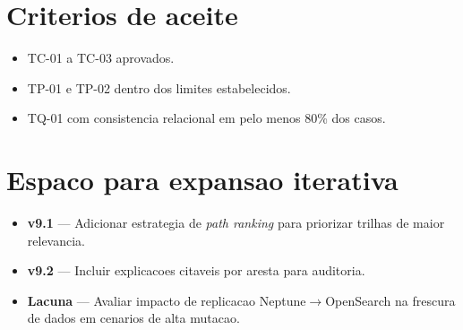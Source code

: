 \section{Criterios de aceite}

\begin{itemize}[leftmargin=*]
  \item TC-01 a TC-03 aprovados.
  \item TP-01 e TP-02 dentro dos limites estabelecidos.
  \item TQ-01 com consistencia relacional em pelo menos 80\% dos casos.
\end{itemize}

\section{Espaco para expansao iterativa}

\begin{itemize}[leftmargin=*]
  \item \textbf{v9.1} --- Adicionar estrategia de \textit{path ranking}
        para priorizar trilhas de maior relevancia.
  \item \textbf{v9.2} --- Incluir explicacoes citaveis por aresta para auditoria.
  \item \textbf{Lacuna} --- Avaliar impacto de replicacao Neptune$\to$OpenSearch
        na frescura de dados em cenarios de alta mutacao.
\end{itemize}
